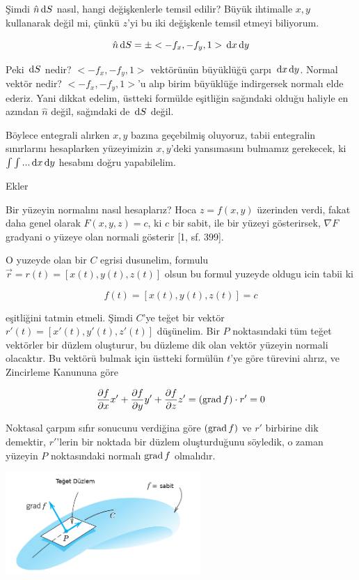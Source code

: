 \documentclass[12pt,fleqn]{article}\usepackage{../../common}
\begin{document}
Şimdi $\hat{n} \,\mathrm{d} S$ nasıl, hangi değişkenlerle temsil edilir? Büyük ihtimalle
$x,y$ kullanarak değil mi, çünkü $z$'yi bu iki değişkenle temsil etmeyi
biliyorum.

$$
\hat{n} \,\mathrm{d} S = \pm < -f_x, -f_y, 1 > \,\mathrm{d} x \,\mathrm{d} y
$$

Peki $\,\mathrm{d} S$ nedir? $< -f_x, -f_y, 1 >$ vektörünün büyüklüğü çarpı $\,\mathrm{d} x \,\mathrm{d} y$.
Normal vektör nedir? $< -f_x, -f_y, 1 >$'u alıp birim büyüklüğe indirgersek
normalı elde ederiz. Yani dikkat edelim, üstteki formülde eşitliğin sağındaki
olduğu haliyle en azından $\hat{n}$ değil, sağındaki de $\,\mathrm{d} S$ değil.

Böylece entegrali alırken $x,y$ bazına geçebilmiş oluyoruz, tabii entegralin
sınırlarını hesaplarken yüzeyimizin $x,y$'deki yansımasını bulmamız gerekecek,
ki $\int \int ... \,\mathrm{d} x \,\mathrm{d} y$ hesabını doğru yapabilelim.

Ekler

Bir yüzeyin normalını nasıl hesaplarız? Hoca $z = f(x,y)$ üzerinden verdi, fakat
daha genel olarak $F(x,y,z) = c$, ki $c$ bir sabit, ile bir yüzeyi gösterirsek,
$\nabla F$ gradyani o yüzeye olan normali gösterir [1, sf. 399].

O yuzeyde olan bir $C$ egrisi dusunelim, formulu $\vec{r} = r(t) = [x(t),y(t),z(t)]$ 
olsun bu formul yuzeyde oldugu icin tabii ki

$$
f(t) = [x(t),y(t),z(t)] = c
$$

eşitliğini tatmin etmeli. Şimdi $C$'ye teğet bir vektör $r'(t) = [x'(t),y'(t),z'(t)]$ 
düşünelim. Bir $P$ noktasındaki tüm teğet vektörler bir düzlem
oluşturur, bu düzleme dik olan vektör yüzeyin normali olacaktır. Bu vektörü
bulmak için üstteki formülün $t$'ye göre türevini alırız, ve Zincirleme Kanununa
göre

$$
\frac{\partial f}{\partial x} x' + 
\frac{\partial f}{\partial y} y' + 
\frac{\partial f}{\partial z} z'  = (\operatorname{grad} f) \cdot r' = 0
$$

Noktasal çarpım sıfır sonucunu verdiğina göre $(\operatorname{grad} f)$ ve $r'$ birbirine
dik demektir, $r'$'lerin bir noktada bir düzlem oluşturduğunu söyledik,
o zaman yüzeyin $P$ noktasındaki normalı $\operatorname{grad} f$ olmalıdır.

\includegraphics[width=20em]{calc_multi_27_10.png}
\end{document}
